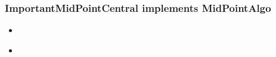 	
	
	
	\subsubsection{ImportantMidPointCentral implements MidPointAlgo}
	
	
	\begin{itemize}
		\item 
		\begin{description}
			\item 
		\end{description}
	\end{itemize}
	\begin{itemize}
		\item 
		\begin{description}
			\item 
		\end{description}
	\end{itemize}
	
	\newpage